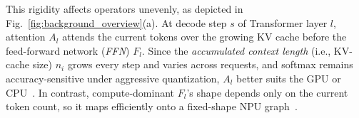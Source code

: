 \documentclass[sigconf,nonacm,10pt]{acmart}
\begin{document}
This rigidity affects operators unevenly, as depicted in {\color{red}Fig.~\ref{fig:background_overview}(a)}. At decode step $s$ of Transformer layer $l$, attention $A_l$ attends the current tokens over the growing KV cache before the feed-forward network (\emph{FFN}) $F_l$. Since the \emph{accumulated context length} (i.e., KV-cache size) $n_i$ grows every step and varies across requests, and softmax remains accuracy-sensitive under aggressive quantization, $A_l$ better suits the GPU or CPU~\cite{xu2025fastondevice,yin2025shadowattn}. In contrast, compute-dominant $F_l$'s shape depends only on the current token count, so it maps efficiently onto a fixed-shape NPU graph~\cite{chen2025heterollm,chen2025heteroinfer}.

\end{document}
